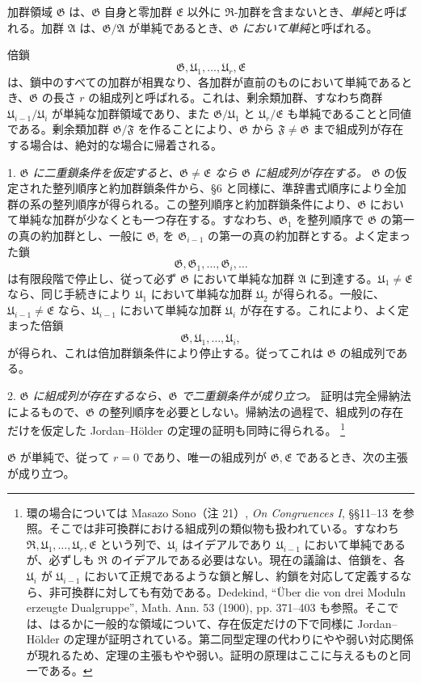 \documentclass[11pt]{article}
\providecommand{\mR}{\mathfrak{R}}
\providecommand{\mA}{\mathfrak{A}}
\providecommand{\mE}{\mathfrak{E}}
\providecommand{\mF}{\mathfrak{F}}
\providecommand{\mG}{\mathfrak{G}}
\providecommand{\mU}{\mathfrak{U}}
\begin{document}
加群領域 $\mG$ は、$\mG$ 自身と零加群 $\mE$ 以外に $\mR$-加群を含まないとき、\emph{単純}と呼ばれる。加群 $\mA$ は、$\mG/\mA$ が単純であるとき、\emph{$\mG$ において単純}と呼ばれる。

倍鎖
\[
        \mG,\mU_1,\ldots,\mU_r,\mE
\]
は、鎖中のすべての加群が相異なり、各加群が直前のものにおいて単純であるとき、$\mG$ の長さ $r$ の組成列と呼ばれる。これは、剰余類加群、すなわち商群 $\mU_{i-1}/\mU_i$ が単純な加群領域であり、また $\mG/\mU_1$ と $\mU_r/\mE$ も単純であることと同値である。剰余類加群 $\mG/\mF$ を作ることにより、$\mG$ から $\mF\ne\mG$ まで組成列が存在する場合は、絶対的な場合に帰着される。

1. \emph{$\mG$ に二重鎖条件を仮定すると、$\mG\ne\mE$ なら $\mG$ に組成列が存在する。} $\mG$ の仮定された整列順序と約加群鎖条件から、§6 と同様に、準辞書式順序により全加群の系の整列順序が得られる。この整列順序と約加群鎖条件により、$\mG$ において単純な加群が少なくとも一つ存在する。すなわち、$\mG_1$ を整列順序で $\mG$ の第一の真の約加群とし、一般に $\mG_i$ を $\mG_{i-1}$ の第一の真の約加群とする。よく定まった鎖
\[
        \mG,\mG_1,\ldots,\mG_i,\ldots
\]
は有限段階で停止し、従って必ず $\mG$ において単純な加群 $\mA$ に到達する。$\mU_1\ne\mE$ なら、同じ手続きにより $\mU_1$ において単純な加群 $\mU_2$ が得られる。一般に、$\mU_{i-1}\ne\mE$ なら、$\mU_{i-1}$ において単純な加群 $\mU_i$ が存在する。これにより、よく定まった倍鎖
\[
        \mG,\mU_1,\ldots,\mU_i,
\]
が得られ、これは倍加群鎖条件により停止する。従ってこれは $\mG$ の組成列である。

2. \emph{$\mG$ に組成列が存在するなら、$\mG$ で二重鎖条件が成り立つ。} 証明は完全帰納法によるもので、$\mG$ の整列順序を必要としない。帰納法の過程で、組成列の存在だけを仮定した Jordan--Hölder の定理の証明も同時に得られる。
\footnote{環の場合については Masazo Sono（注 21）, \emph{On Congruences I}, §§11--13 を参照。そこでは非可換群における組成列の類似物も扱われている。すなわち $\mR,\mU_1,\ldots,\mU_r,\mE$ という列で、$\mU_i$ はイデアルであり $\mU_{i-1}$ において単純であるが、必ずしも $\mR$ のイデアルである必要はない。現在の議論は、倍鎖を、各 $\mU_i$ が $\mU_{i-1}$ において正規であるような鎖と解し、約鎖を対応して定義するなら、非可換群に対しても有効である。Dedekind, ``Über die von drei Moduln erzeugte Dualgruppe'', Math. Ann. 53 (1900), pp. 371--403 も参照。そこでは、はるかに一般的な領域について、存在仮定だけの下で同様に Jordan--Hölder の定理が証明されている。第二同型定理の代わりにやや弱い対応関係が現れるため、定理の主張もやや弱い。証明の原理はここに与えるものと同一である。}

$\mG$ が単純で、従って $r=0$ であり、唯一の組成列が $\mG,\mE$ であるとき、次の主張が成り立つ。
\end{document}
